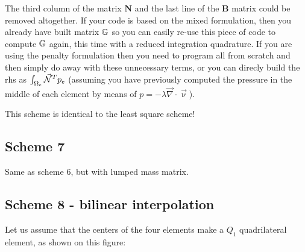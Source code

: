 \begin{remark}
The third column of the matrix ${\bm N}$
and the last line of the ${\bm B}$ matrix could be removed altogether.
If your code is based on the mixed formulation, then you already 
have built matrix ${\mathbb{G}}$ so you can easily re-use this piece of code 
to compute ${\mathbb{G}}$ again, this time with a reduced integration quadrature.
If you are using the penalty formulation then you need to program 
all from scratch and then simply do away with these unnecessary terms, or 
you can direcly build the rhs as $\int_{\Omega_e} \vec{{\mathcal{N}}}^T p_e$ (assuming
you have previously computed the pressure in the middle of each element 
by means of $p=-\lambda\vec\nabla\cdot\vec\upnu$).
\end{remark}

\begin{remark}
This  scheme is identical to the least square scheme!
\end{remark}


\subsection{Scheme 7}

Same as scheme 6, but with lumped mass matrix.  


\subsection{Scheme 8 - bilinear interpolation} 

Let us assume that the centers of the 
four elements make a $Q_1$ quadrilateral element, as shown on this figure:



